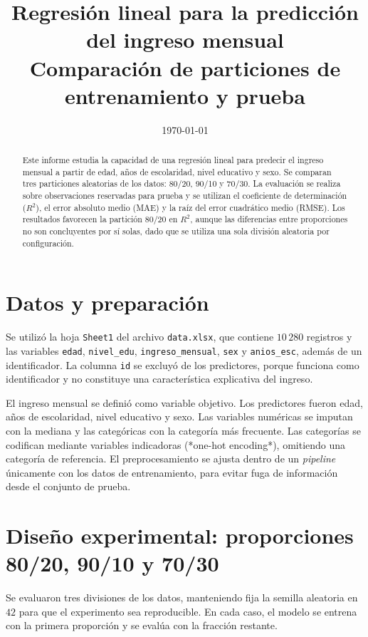 \documentclass[12pt,a4paper]{article}
\title{\textbf{Regresión lineal para la predicción del ingreso mensual}\\
\large Comparación de particiones de entrenamiento y prueba}
\date{\today}
\begin{document}
\maketitle

\begin{abstract}
Este informe estudia la capacidad de una regresión lineal para predecir el ingreso mensual a partir de edad, años de escolaridad, nivel educativo y sexo. Se comparan tres particiones aleatorias de los datos: 80/20, 90/10 y 70/30. La evaluación se realiza sobre observaciones reservadas para prueba y se utilizan el coeficiente de determinación ($R^2$), el error absoluto medio (MAE) y la raíz del error cuadrático medio (RMSE). Los resultados favorecen la partición 80/20 en $R^2$, aunque las diferencias entre proporciones no son concluyentes por sí solas, dado que se utiliza una sola división aleatoria por configuración.
\end{abstract}

\section{Datos y preparación}
Se utilizó la hoja \texttt{Sheet1} del archivo \texttt{data.xlsx}, que contiene $10\,280$ registros y las variables \texttt{edad}, \texttt{nivel\_edu}, \texttt{ingreso\_mensual}, \texttt{sex} y \texttt{anios\_esc}, además de un identificador. La columna \texttt{id} se excluyó de los predictores, porque funciona como identificador y no constituye una característica explicativa del ingreso.

El ingreso mensual se definió como variable objetivo. Los predictores fueron edad, años de escolaridad, nivel educativo y sexo. Las variables numéricas se imputan con la mediana y las categóricas con la categoría más frecuente. Las categorías se codifican mediante variables indicadoras (*one-hot encoding*), omitiendo una categoría de referencia. El preprocesamiento se ajusta dentro de un \textit{pipeline} únicamente con los datos de entrenamiento, para evitar fuga de información desde el conjunto de prueba.

\section{Diseño experimental: proporciones 80/20, 90/10 y 70/30}
Se evaluaron tres divisiones de los datos, manteniendo fija la semilla aleatoria en $42$ para que el experimento sea reproducible. En cada caso, el modelo se entrena con la primera proporción y se evalúa con la fracción restante.
\end{document}
